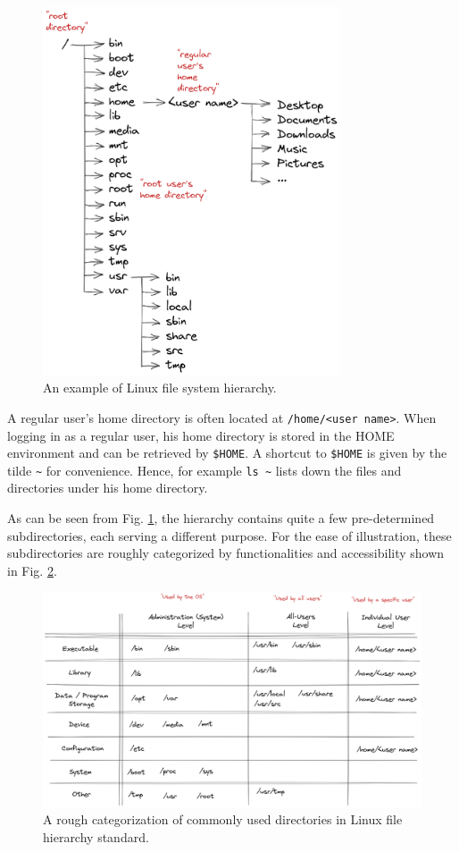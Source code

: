 \begin{figure}[!htb]
	\centering
	\includegraphics[width=250pt]{chapters/part-1/figures/linux_file_hierarchy.png}
	\caption{An example of Linux file system hierarchy.} \label{ch:fm:fig:hierarchy}
\end{figure}

A regular user's home directory is often located at \verb|/home/<user name>|. When logging in as a regular user, his home directory is stored in the HOME environment and can be retrieved by \verb|$HOME|. A shortcut to \verb|$HOME| is given by the tilde \verb|~| for convenience. Hence, for example \verb|ls ~| lists down the files and directories under his home directory.

As can be seen from Fig. \ref{ch:fm:fig:hierarchy}, the hierarchy contains quite a few pre-determined subdirectories, each serving a different purpose. For the ease of illustration, these subdirectories are roughly categorized by functionalities and accessibility shown in Fig. \ref{ch:fm:fig:directorycate}.

\begin{figure}[!htb]
	\centering
	\includegraphics[width=350pt]{chapters/part-1/figures/linux_directory_cate.png}
	\caption{A rough categorization of commonly used directories in Linux file hierarchy standard.} \label{ch:fm:fig:directorycate}
\end{figure}

